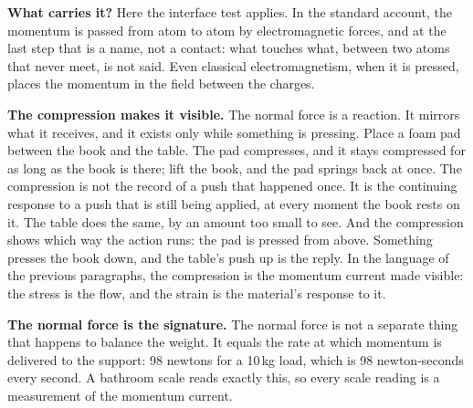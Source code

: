 \documentclass[11pt,a4paper]{article}
\begin{document}
\textbf{What carries it?} Here the interface test applies. In the standard account, the momentum is passed from atom to atom by electromagnetic forces, and at the last step that is a name, not a contact: what touches what, between two atoms that never meet, is not said. Even classical electromagnetism, when it is pressed, places the momentum in the field between the charges. 

\textbf{The compression makes it visible.} The normal force is a reaction. It mirrors what it receives, and it exists only while something is pressing. Place a foam pad between the book and the table. The pad compresses, and it stays compressed for as long as the book is there; lift the book, and the pad springs back at once. The compression is not the record of a push that happened once. It is the continuing response to a push that is still being applied, at every moment the book rests on it. The table does the same, by an amount too small to see. And the compression shows which way the action runs: the pad is pressed from above. Something presses the book down, and the table's push up is the reply. In the language of the previous paragraphs, the compression is the momentum current made visible: the stress is the flow, and the strain is the material's response to it.

\textbf{The normal force is the signature.} The normal force is not a separate thing that happens to balance the weight. It equals the rate at which momentum is delivered to the support: 98 newtons for a 10\,kg load, which is 98 newton-seconds every second. A bathroom scale reads exactly this, so every scale reading is a measurement of the momentum current. 
\end{document}
